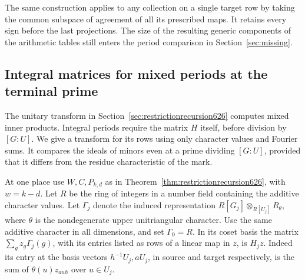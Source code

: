 \documentclass[a4paper,11pt]{article}
\theoremstyle{definition}
\theoremstyle{remark}
\numberwithin{equation}{section}
\begin{document}
The same construction applies to any collection on a single target
row by taking the common subspace of agreement of all its prescribed
maps. It retains every sign before the last projections. The size of
the resulting generic components of the arithmetic tables still
enters the period comparison in Section~\ref{sec:missing}.


\subsection{Integral matrices for mixed periods at the terminal prime}
\label{sec:integralrestrictions627}

The unitary transform in Section~\ref{sec:restrictionrecursion626}
computes mixed inner products. Integral periods require the matrix
\(H\) itself, before division by \([G:U]\). We give a transform
for its rows using only character values and Fourier sums. It
compares the ideals of minors even at a prime dividing \([G:U]\),
provided that it differs from the residue characteristic of the mark.

At one place use \(W,C,P_{k,d}\) as in
Theorem~\ref{thm:restrictionrecursion626}, with \(w=k-d\).
Let \(R\) be the ring of integers in a number field containing the
additive character values. Let \(\Gamma_j\) denote the induced
representation \(R[G_j]\otimes_{R[U_j]} R_\theta\), where
\(\theta\) is the nondegenerate upper unitriangular character.
Use the same additive character in all dimensions, and set
\(\Gamma_0=R\). In its coset basis the matrix
\(\sum_g z_g\Gamma_j(g)\), with its entries listed as rows of a
linear map in \(z\), is \(H_jz\). Indeed its entry at the basis
vectors \(h^{-1}U_j,aU_j\), in source and target respectively,
is the sum of \(\theta(u)z_{auh}\) over \(u\in U_j\).
\end{document}
